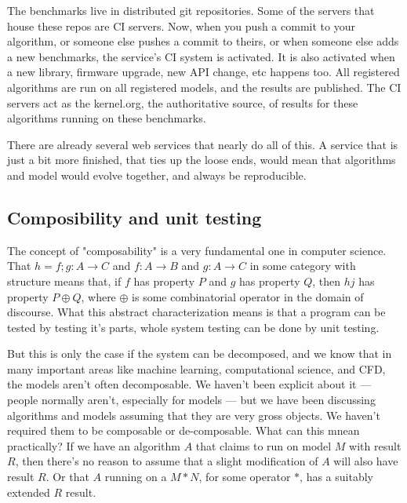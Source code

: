 \documentclass[conference]{IEEEtran}
\begin{document}
The benchmarks live in distributed git repositories. Some of the
servers that house these repos are CI servers. Now, when you push a
commit to your algorithm, or someone else pushes a commit to theirs,
or when someone else adds a new benchmarks, the service's CI system is
activated. It is also activated when a new library, firmware upgrade,
new API change, etc happens too. All registered algorithms are run on
all registered models, and the results are published. The CI servers
act as the kernel.org, the authoritative source, of results for these
algorithms running on these benchmarks.

There are already several web services that nearly do all of this. A
service that is just a bit more finished, that ties up the loose ends,
would mean that algorithms and model would evolve together, and always
be reproducible.

\subsection{Composibility and unit testing}


The concept of "composability" is a very fundamental one in computer science. 
That $h = f;g : A \rightarrow C$ and $f : A \rightarrow B$ and $g : A \rightarrow C$ 
in some category with structure means that, if $f$ has property $P$ and $g$ has
property $Q$, then $hj$ has property $P \oplus Q$, where $\oplus$ is some 
combinatorial operator in the domain of discourse. What this abstract 
characterization means is that a program can be tested by testing it's parts,
whole system testing can be done by unit testing. 

But this is only the case if the system can be decomposed, and we know that in
many important areas like machine learning, computational science, and CFD,
the models aren't often decomposable.  We haven't been explicit about it ---
people normally aren't, especially for models ---  but we have been discussing
algorithms and models assuming that they are very gross objects. We haven't
required them to be composable or de-composable. What can this mnean
practically? If we have an algorithm $A$ that claims to  run on model $M$ with
result $R$, then there's no reason to assume that a slight modification of $A$
will also have result $R$. Or that $A$ running on a $M * N$, for some operator
$*$, has a suitably extended $R$ result.
\end{document}
